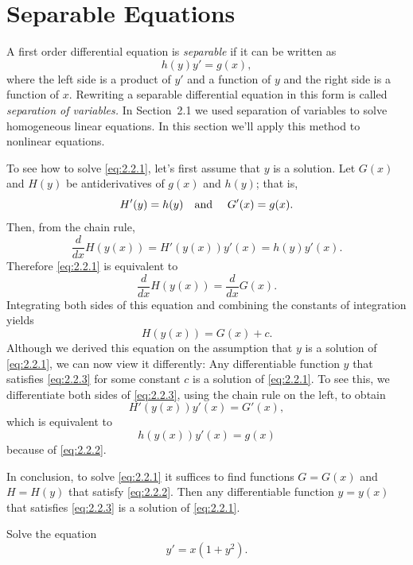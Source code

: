 \section{Separable Equations}

\noindent
A first order differential equation is {\color{blue}\it separable} if it can be written as
\begin{equation}
  \label{eq:2.2.1}h(y)y'=g(x),
\end{equation}
where the left side is a product of $y'$ and a function of $y$ and the right side is a function of
$x$. Rewriting a separable differential equation in this form is called {\color{blue}\it separation
of variables.\/} In Section~2.1 we used separation of variables to solve homogeneous linear
equations. In this section we'll apply this method to nonlinear equations.

To see how to solve \eqref{eq:2.2.1}, let's first assume that $y$ is a solution. Let $G(x)$ and
$H(y)$ be antiderivatives of $g(x)$ and $h(y)$; that is,
\begin{equation}
  \label{eq:2.2.2}H'(y)=h(y)\mbox{\quad and \quad}G'(x)=g(x).
\end{equation}
Then, from the chain rule,
\[
  \frac{d}{dx}H(y(x))=H'(y(x))y'(x)=h(y)y'(x).
\]
Therefore \eqref{eq:2.2.1} is equivalent to
\[
  \frac{d}{dx}H(y(x))=\frac{d}{dx}G(x).
\]
Integrating both sides of this equation and combining the constants of integration yields
\begin{equation}
  \label{eq:2.2.3}H(y(x))=G(x)+c.
\end{equation}
Although we derived this equation on the assumption that $y$ is a solution of \eqref{eq:2.2.1}, we
can now view it differently: Any differentiable function $y$ that satisfies \eqref{eq:2.2.3} for
some constant $c$ is a solution of \eqref{eq:2.2.1}. To see this, we differentiate both sides of
\eqref{eq:2.2.3}, using the chain rule on the left, to obtain
\[
  H'(y(x))y'(x)=G'(x),
\]
which is equivalent to
\[
  h(y(x))y'(x)=g(x)
\]
because of \eqref{eq:2.2.2}.

In conclusion, to solve \eqref{eq:2.2.1} it suffices to find functions $G=G(x)$ and $H=H(y)$ that
satisfy \eqref{eq:2.2.2}. Then any differentiable function $y=y(x)$ that satisfies \eqref{eq:2.2.3}
is a solution of \eqref{eq:2.2.1}.

\begin{example}
  \label{example:2.2.1}\rm Solve the equation
  \[
    y'=x(1+y^{2}).
  \]
\end{example}

